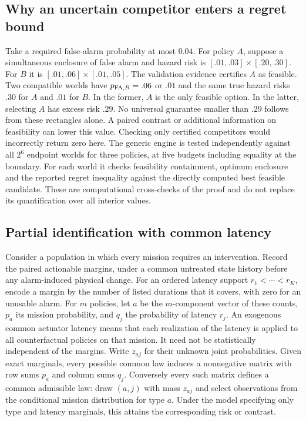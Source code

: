 \subsection{Why an uncertain competitor enters a regret bound}
Take a required false-alarm probability at most $0.04$. For policy $A$, suppose a simultaneous enclosure of false alarm and hazard risk is $[.01,.03]\times[.20,.30]$. For $B$ it is $[.01,.06]\times[.01,.05]$. The validation evidence certifies $A$ as feasible. Two compatible worlds have $p_{{\rm FA},B}=.06$ or $.01$ and the same true hazard risks $.30$ for $A$ and $.01$ for $B$. In the former, $A$ is the only feasible option. In the latter, selecting $A$ has excess risk $.29$. No universal guarantee smaller than $.29$ follows from these rectangles alone. A paired contrast or additional information on feasibility can lower this value. Checking only certified competitors would incorrectly return zero here. The generic engine is tested independently against all $2^6$ endpoint worlds for three policies, at five budgets including equality at the boundary. For each world it checks feasibility containment, optimum enclosure and the reported regret inequality against the directly computed best feasible candidate. These are computational cross-checks of the proof and do not replace its quantification over all interior values.

\subsection{Partial identification with common latency}
Consider a population in which every mission requires an intervention. Record the paired actionable margins, under a common untreated state history before any alarm-induced physical change. For an ordered latency support $r_1<\cdots<r_K$, encode a margin by the number of listed durations that it covers, with zero for an unusable alarm. For $m$ policies, let $a$ be the $m$-component vector of these counts, $p_a$ its mission probability, and $q_j$ the probability of latency $r_j$. An exogenous common actuator latency means that each realization of the latency is applied to all counterfactual policies on that mission. It need not be statistically independent of the margins. Write $z_{aj}$ for their unknown joint probabilities. Given exact marginals, every possible common law induces a nonnegative matrix with row sums $p_a$ and column sums $q_j$. Conversely every such matrix defines a common admissible law: draw $(a,j)$ with mass $z_{aj}$ and select observations from the conditional mission distribution for type $a$. Under the model specifying only type and latency marginals, this attains the corresponding risk or contrast.

